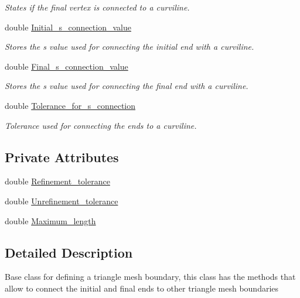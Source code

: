 \begin{DoxyCompactItemize}
\begin{DoxyCompactList}\small\item\em States if the final vertex is connected to a curviline. \end{DoxyCompactList}\item 
double \hyperlink{classoomph_1_1TriangleMeshCurveSection_a2b32da41a8d74257d372e7ebb720d384}{Initial\+\_\+s\+\_\+connection\+\_\+value}
\begin{DoxyCompactList}\small\item\em Stores the s value used for connecting the initial end with a curviline. \end{DoxyCompactList}\item 
double \hyperlink{classoomph_1_1TriangleMeshCurveSection_a353c5ea574d6dbceaec36eb541325236}{Final\+\_\+s\+\_\+connection\+\_\+value}
\begin{DoxyCompactList}\small\item\em Stores the s value used for connecting the final end with a curviline. \end{DoxyCompactList}\item 
double \hyperlink{classoomph_1_1TriangleMeshCurveSection_a9776c1484d720242d6293a7a6aa57eda}{Tolerance\+\_\+for\+\_\+s\+\_\+connection}
\begin{DoxyCompactList}\small\item\em Tolerance used for connecting the ends to a curviline. \end{DoxyCompactList}\end{DoxyCompactItemize}
\subsection*{Private Attributes}
\begin{DoxyCompactItemize}
\item 
double \hyperlink{classoomph_1_1TriangleMeshCurveSection_a3e8dad0254ccbc33232d86d4488ab475}{Refinement\+\_\+tolerance}
\item 
double \hyperlink{classoomph_1_1TriangleMeshCurveSection_a27532c6686f1c29c6ac47a84ce561895}{Unrefinement\+\_\+tolerance}
\item 
double \hyperlink{classoomph_1_1TriangleMeshCurveSection_a5449b283a0b07ef923253b5fc9e9d024}{Maximum\+\_\+length}
\end{DoxyCompactItemize}


\subsection{Detailed Description}
Base class for defining a triangle mesh boundary, this class has the methods that allow to connect the initial and final ends to other triangle mesh boundaries 

